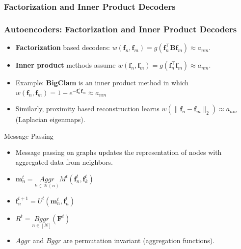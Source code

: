 \documentclass{beamer}
\begin{document}
\subsubsection{Factorization and Inner Product Decoders}
\begin{frame}
\frametitle{Autoencoders: Factorization and Inner Product Decoders}




\begin{itemize}[itemsep=1em, label=\textbullet]
    \item  \textbf{Factorization} based decoders: $w(\mathbf{f}_n, \mathbf{f}_m) = g(\mathbf{f}_n^\top \mathbf{B} \mathbf{f}_m)\approx a_{nm}$.
    \item \textbf{Inner product} methods assume $w(\mathbf{f}_n, \mathbf{f}_m) = g(\mathbf{f}_n^\top \mathbf{f}_m) \approx a_{nm}$.%
    \item Example: \textbf{BigClam} is an inner product method in which $w(\mathbf{f}_n, \mathbf{f}_m) = 1-e^{-\mathbf{f}_n^\top \mathbf{f}_m} \approx a_{nm}$%
    \item Similarly, proximity based reconstruction learns $w(\| \mathbf{f}_n - \mathbf{f}_m\|_2)\approx a_{nm}$ (Laplacian eigenmaps).%
\end{itemize}




\end{frame}


\begin{frame}{Message Passing}
    \begin{itemize}
        \item Message passing on graphs updates the representation of nodes with aggregated data from neighbors.
    
    \item $\mathbf{m}^{t}_n = \underset{k\in \mathcal{N}(n)}{Aggr}{M^t(\mathbf{f}^t_n,\mathbf{f}^t_k)}$
    \item $\mathbf{f}^{t+1}_n = U^t(\mathbf{m}^t_n, \mathbf{f}^t_n)$
    \vspace{0.3cm}
    \item $R^t = \underset{n\in [N]}{Bggr}(\mathbf{F}^t)$
    \item $Aggr$ and $Bggr$ are permutation invariant (aggregation functions).
    \end{itemize}
\end{frame}
\end{document}
